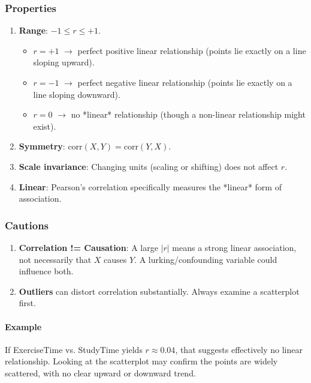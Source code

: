 \documentclass[10pt, total={6in, 8in}]{extarticle}
\begin{document}
\subsubsection{Properties}

\begin{enumerate}
    \item \textbf{Range}: $-1 \le r \le +1$.
          \begin{itemize}
              \item $r = +1$ $\rightarrow$ perfect positive linear relationship (points lie exactly on a line sloping upward).
              \item $r = -1$ $\rightarrow$ perfect negative linear relationship (points lie exactly on a line sloping downward).
              \item $r = 0$ $\rightarrow$ no *linear* relationship (though a non-linear relationship might exist).
          \end{itemize}
    \item \textbf{Symmetry}: $\text{corr}(X, Y) = \text{corr}(Y, X)$.
    \item \textbf{Scale invariance}: Changing units (scaling or shifting) does not affect $r$.
    \item \textbf{Linear}: Pearson's correlation specifically measures the *linear* form of association.
\end{enumerate}

\subsubsection{Cautions}

\begin{enumerate}
    \item \textbf{Correlation != Causation}: A large $|r|$ means a strong linear association, not necessarily that $X$ causes $Y$. A lurking/confounding variable could influence both.
    \item \textbf{Outliers} can distort correlation substantially. Always examine a scatterplot first.
\end{enumerate}

\paragraph{Example} If ExerciseTime vs. StudyTime yields $r \approx 0.04$, that suggests effectively no linear relationship. Looking at the scatterplot may confirm the points are widely scattered, with no clear upward or downward trend.
\end{document}
